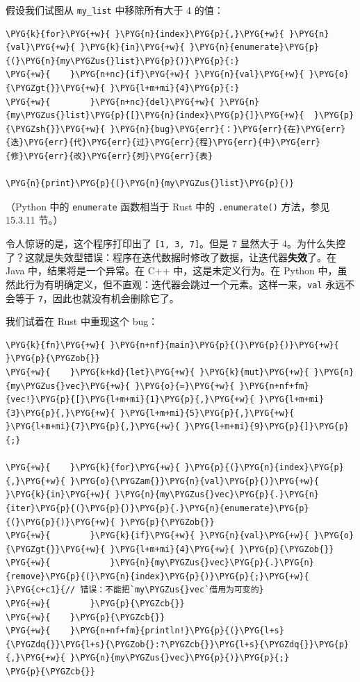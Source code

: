 假设我们试图从 \texttt{my\_list} 中移除所有大于 4 的值：

\begin{Verbatim}[commandchars=\\\{\},breaklines=true,breakanywhere=true,fontsize=\codefont,xleftmargin=17bp]
\PYG{k}{for}\PYG{+w}{ }\PYG{n}{index}\PYG{p}{,}\PYG{+w}{ }\PYG{n}{val}\PYG{+w}{ }\PYG{k}{in}\PYG{+w}{ }\PYG{n}{enumerate}\PYG{p}{(}\PYG{n}{my\PYGZus{}list}\PYG{p}{)}\PYG{p}{:}
\PYG{+w}{    }\PYG{n+nc}{if}\PYG{+w}{ }\PYG{n}{val}\PYG{+w}{ }\PYG{o}{\PYGZgt{}}\PYG{+w}{ }\PYG{l+m+mi}{4}\PYG{p}{:}
\PYG{+w}{        }\PYG{n+nc}{del}\PYG{+w}{ }\PYG{n}{my\PYGZus{}list}\PYG{p}{[}\PYG{n}{index}\PYG{p}{]}\PYG{+w}{  }\PYG{p}{\PYGZsh{}}\PYG{+w}{ }\PYG{n}{bug}\PYG{err}{：}\PYG{err}{在}\PYG{err}{迭}\PYG{err}{代}\PYG{err}{过}\PYG{err}{程}\PYG{err}{中}\PYG{err}{修}\PYG{err}{改}\PYG{err}{列}\PYG{err}{表}

\PYG{n}{print}\PYG{p}{(}\PYG{n}{my\PYGZus{}list}\PYG{p}{)}
\end{Verbatim}

（Python 中的 \texttt{enumerate} 函数相当于 Rust 中的 \texttt{.enumerate()} 方法，参见 15.3.11 节。）

令人惊讶的是，这个程序打印出了 \texttt{[1, 3, 7]}。但是 7 显然大于 4。为什么失控了？这就是失效型错误：程序在迭代数据时修改了数据，让迭代器\textbf{失效}了。在 Java 中，结果将是一个异常。在 C++ 中，这是未定义行为。在 Python 中，虽然此行为有明确定义，但不直观：迭代器会跳过一个元素。这样一来，\texttt{val} 永远不会等于 \texttt{7}，因此也就没有机会删除它了。

我们试着在 Rust 中重现这个 bug：

\begin{Verbatim}[commandchars=\\\{\},breaklines=true,breakanywhere=true,fontsize=\codefont,xleftmargin=17bp]
\PYG{k}{fn}\PYG{+w}{ }\PYG{n+nf}{main}\PYG{p}{(}\PYG{p}{)}\PYG{+w}{ }\PYG{p}{\PYGZob{}}
\PYG{+w}{    }\PYG{k+kd}{let}\PYG{+w}{ }\PYG{k}{mut}\PYG{+w}{ }\PYG{n}{my\PYGZus{}vec}\PYG{+w}{ }\PYG{o}{=}\PYG{+w}{ }\PYG{n+nf+fm}{vec!}\PYG{p}{[}\PYG{l+m+mi}{1}\PYG{p}{,}\PYG{+w}{ }\PYG{l+m+mi}{3}\PYG{p}{,}\PYG{+w}{ }\PYG{l+m+mi}{5}\PYG{p}{,}\PYG{+w}{ }\PYG{l+m+mi}{7}\PYG{p}{,}\PYG{+w}{ }\PYG{l+m+mi}{9}\PYG{p}{]}\PYG{p}{;}

\PYG{+w}{    }\PYG{k}{for}\PYG{+w}{ }\PYG{p}{(}\PYG{n}{index}\PYG{p}{,}\PYG{+w}{ }\PYG{o}{\PYGZam{}}\PYG{n}{val}\PYG{p}{)}\PYG{+w}{ }\PYG{k}{in}\PYG{+w}{ }\PYG{n}{my\PYGZus{}vec}\PYG{p}{.}\PYG{n}{iter}\PYG{p}{(}\PYG{p}{)}\PYG{p}{.}\PYG{n}{enumerate}\PYG{p}{(}\PYG{p}{)}\PYG{+w}{ }\PYG{p}{\PYGZob{}}
\PYG{+w}{        }\PYG{k}{if}\PYG{+w}{ }\PYG{n}{val}\PYG{+w}{ }\PYG{o}{\PYGZgt{}}\PYG{+w}{ }\PYG{l+m+mi}{4}\PYG{+w}{ }\PYG{p}{\PYGZob{}}
\PYG{+w}{            }\PYG{n}{my\PYGZus{}vec}\PYG{p}{.}\PYG{n}{remove}\PYG{p}{(}\PYG{n}{index}\PYG{p}{)}\PYG{p}{;}\PYG{+w}{  }\PYG{c+c1}{// 错误：不能把`my\PYGZus{}vec`借用为可变的}
\PYG{+w}{        }\PYG{p}{\PYGZcb{}}
\PYG{+w}{    }\PYG{p}{\PYGZcb{}}
\PYG{+w}{    }\PYG{n+nf+fm}{println!}\PYG{p}{(}\PYG{l+s}{\PYGZdq{}}\PYG{l+s}{\PYGZob{}:?\PYGZcb{}}\PYG{l+s}{\PYGZdq{}}\PYG{p}{,}\PYG{+w}{ }\PYG{n}{my\PYGZus{}vec}\PYG{p}{)}\PYG{p}{;}
\PYG{p}{\PYGZcb{}}
\end{Verbatim}


